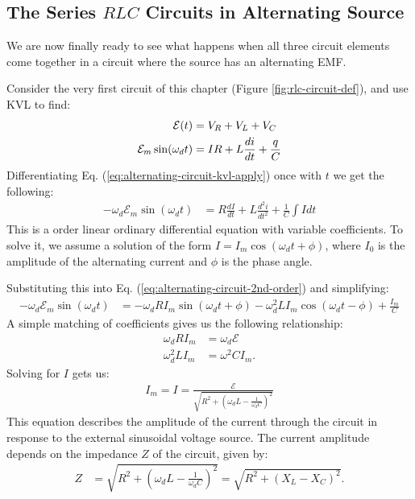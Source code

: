 \documentclass[12pt,b4paper]{article}
\begin{document}
\subsection{The Series $RLC$ Circuits in Alternating Source}
We are now finally ready to see what happens when all three circuit elements come together in a circuit where the source has an alternating EMF.

Consider the very first circuit of this chapter (Figure \ref{fig:rlc-circuit-def}), and use KVL to find:
\begin{align}
    \mathcal{E}(t)&=V_R+V_L+V_C\notag\\
    \mathcal{E}_m\sin(\omega_dt)&=IR+L\frac{di}{dt}+\frac{q}{C}\label{eq:alternating-circuit-kvl-apply}
\end{align}
Differentiating Eq. (\ref{eq:alternating-circuit-kvl-apply}) once with $t$ we get the following:
\begin{align}
    -\omega_d\mathcal{E}_m\sin(\omega_dt)&=R\frac{dI}{dt}+L\frac{d^2i}{dt^2}+\frac{1}{C}\int Idt\label{eq:alternating-circuit-2nd-order}
\end{align}
This is a  order linear ordinary differential equation with variable coefficients. To solve it, we assume a solution of the form $I=I_m\cos(\omega_dt+\phi)$, where $I_0$ is the amplitude of the alternating current and $\phi$ is the phase angle.

Substituting this into Eq. (\ref{eq:alternating-circuit-2nd-order}) and simplifying:
\begin{align}
    -\omega_d\mathcal{E}_m\sin(\omega_dt)&=-\omega_dRI_m\sin(\omega_dt+\phi)-\omega_d^2LI_m\cos(\omega_dt-\phi)+\frac{I_m}{C}
\end{align}
A simple matching of coefficients gives us the following relationship:
\begin{align}
    \omega_dRI_m&=\omega_d\mathcal{E}\\
    \omega_d^2LI_m&=\omega^2CI_m.
\end{align}
Solving for $I$ gets us:
\begin{align}
    I_m=I=\frac{\mathcal{E}}{\displaystyle\sqrt{R^2+\left(\omega_dL-\frac{1}{\omega_dC}\right)^2}}
\end{align}
This equation describes the amplitude of the current through the circuit in response to the external sinusoidal voltage source. The current amplitude depends on the impedance $Z$ of the circuit, given by:
\begin{align}
    Z&=\sqrt{R^2+\left(\omega_dL-\frac{1}{\omega_dC}\right)^2}=\sqrt{R^2+\left(X_L-X_C\right)^2}.
\end{align}
\end{document}
